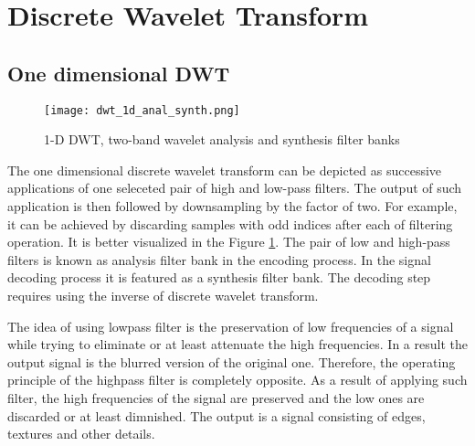 \section{Discrete Wavelet Transform}

\subsection{One dimensional DWT}

\begin{figure}
    \centering
    \texttt{[image: dwt\_1d\_anal\_synth.png]}
    \caption{1-D DWT, two-band wavelet analysis and synthesis filter banks \cite{jpeg_suite}}
    \label{fig:dwt_1d_anal_synth}
\end{figure}

The one dimensional discrete wavelet transform can be depicted as successive applications of
one seleceted pair of high and low-pass filters. The output of such application is then followed
by downsampling by the factor of two. For example, it can be achieved by discarding samples with
odd indices after each of filtering operation. It is better visualized in the Figure \ref{fig:dwt_1d_anal_synth}. \cite{jpeg_suite} 
The pair of low and high-pass filters is known as analysis filter bank in the encoding process.
In the signal decoding process it is featured as a synthesis filter bank. The decoding step requires
using the inverse of discrete wavelet transform. 

The idea of using lowpass filter is the preservation of low frequencies of a signal while trying
to eliminate or at least attenuate the high frequencies. In a result the output signal is the blurred
version of the original one. Therefore, the operating principle of the highpass filter is completely
opposite. As a result of applying such filter, the high frequencies of the signal are preserved and
the low ones are discarded or at least dimnished. The output is a signal consisting of edges, textures
and other details. \cite{jpeg_suite} 

